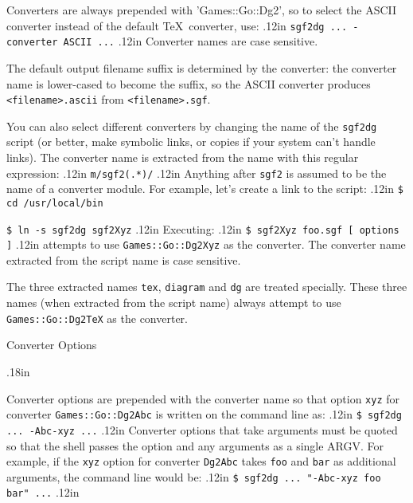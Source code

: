 Converters are always prepended with 'Games::Go::Dg2', so to select
the ASCII converter instead of the default \TeX\ converter, use:
\vglue.12in
    {\tt sgf2dg ... -converter ASCII ...}
\vglue.12in
Converter names are case sensitive.

The default output filename suffix is determined by the converter:
the converter name is lower-cased to become the suffix, so the ASCII
converter produces {\tt <filename>.ascii} from {\tt <filename>.sgf}.

You can also select different converters by changing the name of
the {\tt sgf2dg} script (or better, make symbolic links, or copies if
your system can't handle links).  The converter name is extracted
from the name with this regular expression:
\vglue.12in
    {\tt m/sgf2(.*)/}
\vglue.12in
Anything after {\tt sgf2} is assumed to be the name of a converter
module.  For example, let's create a link to the script:
\vglue.12in
    {\tt \$ cd /usr/local/bin}

    {\tt \$ ln -s sgf2dg sgf2Xyz}
\vglue.12in
Executing:
\vglue.12in
    {\tt \$ sgf2Xyz foo.sgf [ options ]}
\vglue.12in
\noindent
attempts to use {\tt Games::Go::Dg2Xyz} as the converter.  The
converter name extracted from the script name is case sensitive.


The three extracted names {\tt tex}, {\tt diagram} and {\tt dg}
are treated specially. These three names (when extracted from
the script name) always attempt to use {\tt Games::Go::Dg2TeX}
as the converter.

% 
% 

\vfil\eject
\centerline{\titlefont Converter Options}
\vglue.18in

Converter options are prepended with the converter name so that
option {\tt xyz} for converter {\tt Games::Go::Dg2Abc} is written on
the command line as:
\vglue.12in
    {\tt \$ sgf2dg ... -Abc-xyz ...}
\vglue.12in
Converter options that take arguments must be quoted so that the
shell passes the option and any arguments as a single ARGV.  For
example, if the {\tt xyz} option for converter {\tt Dg2Abc} takes {\tt foo} and
{\tt bar} as additional arguments, the command line would be:
\vglue.12in
    {\tt \$ sgf2dg ... "-Abc-xyz foo bar" ...}
\vglue.12in

